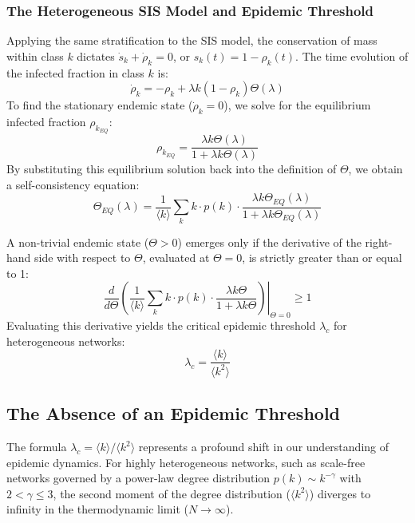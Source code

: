 \subsubsection{The Heterogeneous SIS Model and Epidemic Threshold}

Applying the same stratification to the SIS model, the conservation of mass within class \(k\) dictates \(\dot{s}_k + \dot{\rho}_k = 0\), or \(s_k(t) = 1 - \rho_k(t)\). The time evolution of the infected fraction in class \(k\) is:
\[
    \dot{\rho}_k = -\rho_k + \lambda k (1 - \rho_k) \Theta(\lambda)
\]
To find the stationary endemic state (\(\dot{\rho}_k = 0\)), we solve for the equilibrium infected fraction \(\rho_{k_{EQ}}\):
\[
    \rho_{k_{EQ}} = \frac{\lambda k \Theta(\lambda)}{1 + \lambda k \Theta(\lambda)}
\]
By substituting this equilibrium solution back into the definition of \(\Theta\), we obtain a self-consistency equation:
\[
    \Theta_{EQ}(\lambda) = \frac{1}{\langle k \rangle} \sum_k k \cdot p(k) \cdot \frac{\lambda k \Theta_{EQ}(\lambda)}{1 + \lambda k \Theta_{EQ}(\lambda)}
\]


A non-trivial endemic state (\(\Theta > 0\)) emerges only if the derivative of the right-hand side with respect to \(\Theta\), evaluated at \(\Theta = 0\), is strictly greater than or equal to 1:
\[
    \left. \frac{d}{d\Theta} \left( \frac{1}{\langle k \rangle} \sum_k k \cdot p(k) \cdot \frac{\lambda k \Theta}{1 + \lambda k \Theta} \right) \right|_{\Theta=0} \geq 1
\]
Evaluating this derivative yields the critical epidemic threshold \(\lambda_c\) for heterogeneous networks:
\[
    \lambda_c = \frac{\langle k \rangle}{\langle k^2 \rangle}
\]

\subsection{The Absence of an Epidemic Threshold}
\label{subsec:no_threshold}

The formula \(\lambda_c = \langle k \rangle / \langle k^2 \rangle\) represents a profound shift in our understanding of epidemic dynamics. For highly heterogeneous networks, such as scale-free networks governed by a power-law degree distribution \(p(k) \sim k^{-\gamma}\) with \(2 < \gamma \le 3\), the second moment of the degree distribution (\(\langle k^2 \rangle\)) diverges to infinity in the thermodynamic limit (\(N \to \infty\)).

